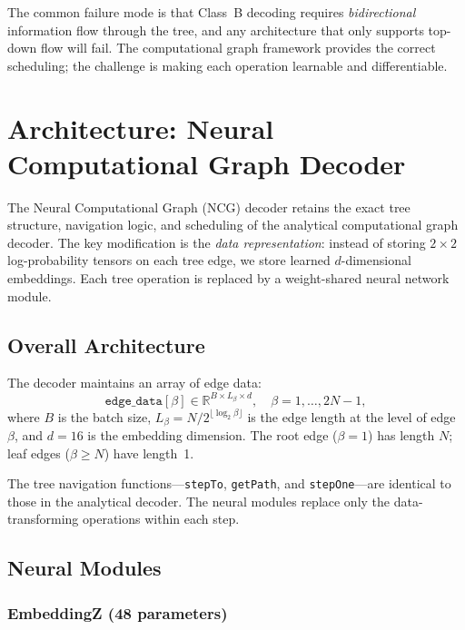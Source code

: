 \documentclass[11pt,a4paper]{article}
\newcommand{\R}{\mathbb{R}}
\begin{document}
The common failure mode is that Class~B decoding requires \emph{bidirectional} information flow through the tree, and any architecture that only supports top-down flow will fail. The computational graph framework provides the correct scheduling; the challenge is making each operation learnable and differentiable.

\section{Architecture: Neural Computational Graph Decoder}
\label{sec:architecture}

The Neural Computational Graph (NCG) decoder retains the exact tree structure, navigation logic, and scheduling of the analytical computational graph decoder. The key modification is the \emph{data representation}: instead of storing $2 \times 2$ log-probability tensors on each tree edge, we store learned $d$-dimensional embeddings. Each tree operation is replaced by a weight-shared neural network module.

\subsection{Overall Architecture}

The decoder maintains an array of edge data:
\begin{equation}
    \texttt{edge\_data}[\beta] \in \R^{B \times L_\beta \times d}, \quad \beta = 1, \ldots, 2N - 1,
\end{equation}
where $B$ is the batch size, $L_\beta = N / 2^{\lfloor \log_2 \beta \rfloor}$ is the edge length at the level of edge~$\beta$, and $d = 16$ is the embedding dimension. The root edge ($\beta = 1$) has length $N$; leaf edges ($\beta \geq N$) have length~1.

The tree navigation functions---\texttt{stepTo}, \texttt{getPath}, and \texttt{stepOne}---are identical to those in the analytical decoder. The neural modules replace only the data-transforming operations within each step.

\subsection{Neural Modules}
\label{sec:modules}

\subsubsection{EmbeddingZ (48 parameters)}
\end{document}
